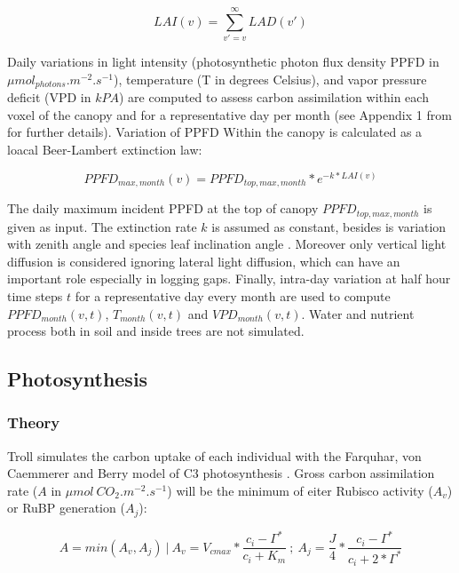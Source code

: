 \documentclass[12pt,]{article}
\theoremstyle{definition}
\theoremstyle{definition}
\theoremstyle{remark}
\begin{document}
\begin{equation}
  LAI(v) = \sum _{v'=v} ^\infty LAD(v') 
  \label{eq:LAI}
\end{equation}

Daily variations in light intensity (photosynthetic photon flux density
PPFD in \(\mu mol_{photons}.m^{-2}.s^{-1}\)), temperature (T in degrees
Celsius), and vapor pressure deficit (VPD in \(kPA\)) are computed to
assess carbon assimilation within each voxel of the canopy and for a
representative day per month (see Appendix 1 from \citet{Li} for further
details). Variation of PPFD Within the canopy is calculated as a loacal
Beer-Lambert extinction law:

\begin{equation}
  PPFD_{max,month}(v) = PPFD_{top,max,month}*e^{-k*LAI(v)}
  \label{eq:PPFD}
\end{equation}

The daily maximum incident PPFD at the top of canopy
\(PPFD_{top,max,month}\) is given as input. The extinction rate \(k\) is
assumed as constant, besides is variation with zenith angle and species
leaf inclination angle \citep{Meir2000}. Moreover only vertical light
diffusion is considered ignoring lateral light diffusion, which can have
an important role especially in logging gaps. Finally, intra-day
variation at half hour time steps \(t\) for a representative day every
month are used to compute \(PPFD_{month}(v,t)\), \(T_{month}(v,t)\) and
\(VPD_{month}(v,t)\). Water and nutrient process both in soil and inside
trees are not simulated.

\subsection{Photosynthesis}\label{photosynthesis}

\subsubsection{Theory}\label{theory}

Troll simulates the carbon uptake of each individual with the Farquhar,
von Caemmerer and Berry model of C3 photosynthesis \citep{Farquhar1980}.
Gross carbon assimilation rate (\(A\) in
\(\mu mol~CO_2. m^{-2}.s^{-1}\)) will be the minimum of eiter Rubisco
activity (\(A_v\)) or RuBP generation (\(A_j\)):

\begin{equation}
  A=min(A_v, A_j)~|~A_v=V_{cmax}*\frac{c_i-\Gamma^*}{c_i+K_m}~;~A_j=\frac{J}{4}*\frac{c_i-\Gamma^*}{c_i+2*\Gamma^*}
  \label{eq:A}
\end{equation}
\end{document}
